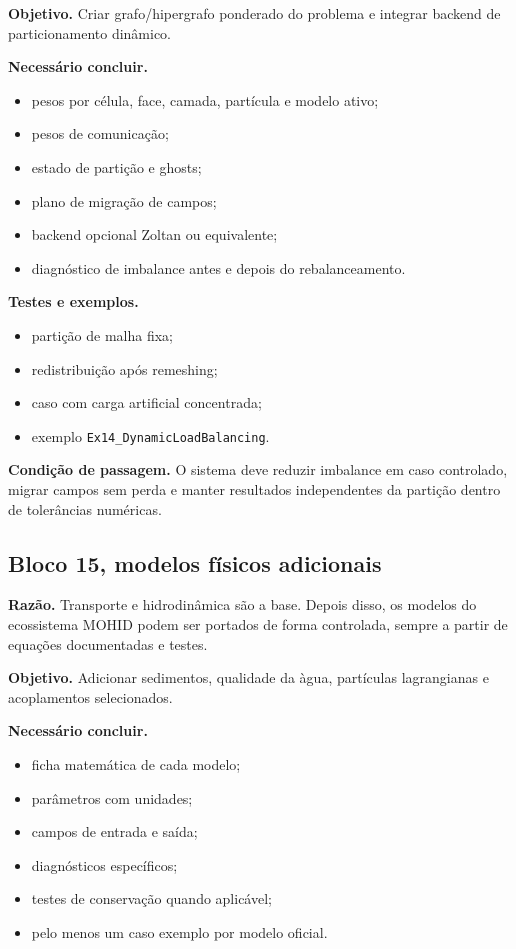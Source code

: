 \documentclass[11pt,a4paper]{article}
\begin{document}
\textbf{Objetivo.} Criar grafo/hipergrafo ponderado do problema e integrar backend de particionamento din\^amico.

\textbf{Necess\'ario concluir.}
\begin{itemize}
  \item pesos por c\'elula, face, camada, part\'icula e modelo ativo;
  \item pesos de comunica\c{c}\~ao;
  \item estado de parti\c{c}\~ao e ghosts;
  \item plano de migra\c{c}\~ao de campos;
  \item backend opcional Zoltan ou equivalente;
  \item diagn\'ostico de imbalance antes e depois do rebalanceamento.
\end{itemize}

\textbf{Testes e exemplos.}
\begin{itemize}
  \item parti\c{c}\~ao de malha fixa;
  \item redistribui\c{c}\~ao ap\'os remeshing;
  \item caso com carga artificial concentrada;
  \item exemplo \texttt{Ex14\_DynamicLoadBalancing}.
\end{itemize}

\textbf{Condi\c{c}\~ao de passagem.} O sistema deve reduzir imbalance em caso controlado, migrar campos sem perda e manter resultados independentes da parti\c{c}\~ao dentro de toler\^ancias num\'ericas.

\subsection*{Bloco 15, modelos f\'isicos adicionais}

\textbf{Raz\~ao.} Transporte e hidrodin\^amica s\~ao a base. Depois disso, os modelos do ecossistema MOHID podem ser portados de forma controlada, sempre a partir de equa\c{c}\~oes documentadas e testes.

\textbf{Objetivo.} Adicionar sedimentos, qualidade da \`agua, part\'iculas lagrangianas e acoplamentos selecionados.

\textbf{Necess\'ario concluir.}
\begin{itemize}
  \item ficha matem\'atica de cada modelo;
  \item par\^ametros com unidades;
  \item campos de entrada e sa\'ida;
  \item diagn\'osticos espec\'ificos;
  \item testes de conserva\c{c}\~ao quando aplic\'avel;
  \item pelo menos um caso exemplo por modelo oficial.
\end{itemize}
\end{document}
